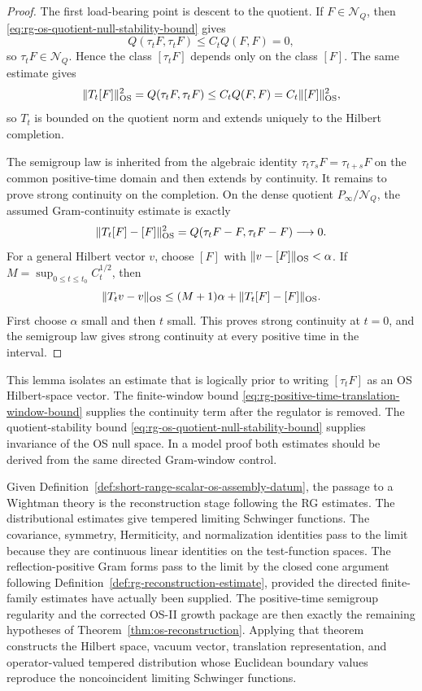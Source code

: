\begin{proof}
The first load-bearing point is descent to the quotient.  If
\(F\in\mathcal N_Q\), then \eqref{eq:rg-os-quotient-null-stability-bound} gives
\[
  Q(\tau_tF,\tau_tF)\le C_tQ(F,F)=0,
\]
so \(\tau_tF\in\mathcal N_Q\).  Hence the class \([\tau_tF]\) depends only on
the class \([F]\).  The same estimate gives
\[
  \|T_t[F]\|_{\rm OS}^2=Q(\tau_tF,\tau_tF)
  \le C_tQ(F,F)=C_t\|[F]\|_{\rm OS}^2,
\]
so \(T_t\) is bounded on the quotient norm and extends uniquely to the Hilbert
completion.

The semigroup law is inherited from the algebraic identity
\(\tau_t\tau_sF=\tau_{t+s}F\) on the common positive-time domain and then
extends by continuity.  It remains to prove strong continuity on the
completion.  On the dense quotient \(P_\infty/\mathcal N_Q\), the assumed
Gram-continuity estimate is exactly
\[
  \|T_t[F]-[F]\|_{\rm OS}^2
  =
  Q(\tau_tF-F,\tau_tF-F)\longrightarrow0 .
\]
For a general Hilbert vector \(v\), choose \([F]\) with
\(\|v-[F]\|_{\rm OS}<\alpha\).  If \(M=\sup_{0\le t\le t_0}C_t^{1/2}\), then
\[
  \|T_tv-v\|_{\rm OS}
  \le (M+1)\alpha+\|T_t[F]-[F]\|_{\rm OS}.
\]
First choose \(\alpha\) small and then \(t\) small.  This proves strong
continuity at \(t=0\), and the semigroup law gives strong continuity at every
positive time in the interval.
\end{proof}

This lemma isolates an estimate that is logically prior to writing
\([\tau_tF]\) as an OS Hilbert-space vector.  The finite-window bound
\eqref{eq:rg-positive-time-translation-window-bound} supplies the continuity
term after the regulator is removed.  The quotient-stability bound
\eqref{eq:rg-os-quotient-null-stability-bound} supplies invariance of the OS
null space.  In a model proof both estimates should be derived from the same
directed Gram-window control.

Given Definition~\ref{def:short-range-scalar-os-assembly-datum}, the passage
to a Wightman theory is the reconstruction stage following the RG estimates.
The distributional estimates give tempered limiting Schwinger functions.
The covariance, symmetry, Hermiticity, and normalization identities pass to
the limit because they are continuous linear identities on the test-function
spaces.  The reflection-positive Gram forms pass to the limit by the closed
cone argument following Definition~\ref{def:rg-reconstruction-estimate},
provided the directed finite-family estimates have actually been supplied.  The
positive-time semigroup regularity and the corrected OS-II growth package are
then exactly the remaining hypotheses of
Theorem~\ref{thm:os-reconstruction}.  Applying that theorem constructs the
Hilbert space, vacuum vector, translation representation, and operator-valued
tempered distribution whose Euclidean boundary values reproduce the
noncoincident limiting Schwinger functions.

